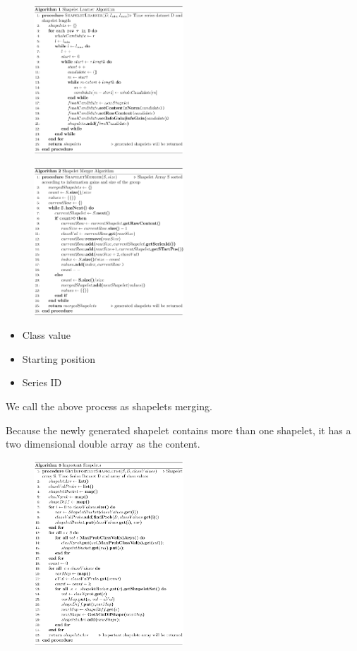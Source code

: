 \documentclass[conference]{IEEEtran}  %
\begin{document}
\begin{figure}
\includegraphics[width=0.5\textwidth]{algo1.png}
\label{fig:algo1}
\end{figure}
\begin{figure}
\includegraphics[width=0.5\textwidth]{algo2.png}
\label{fig:algo2}
\end{figure}
\begin{itemize}
\item Class value
\item Starting position
\item Series ID
\end{itemize}
We call the above process as shapelets merging.

Because the newly generated shapelet contains more than one shapelet, it has a two dimensional double array as the content. 

\begin{figure}
\includegraphics[width=0.5\textwidth]{algo3.png}
\label{algo3}
\end{figure}
\end{document}
